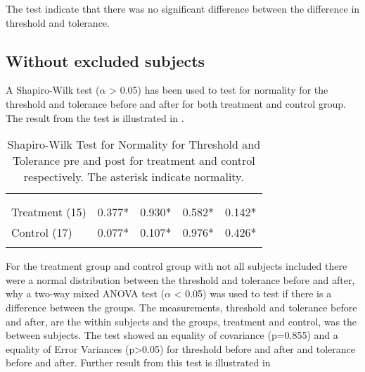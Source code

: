 The test indicate that there was no significant difference between the difference in threshold and tolerance.

\subsection{Without excluded subjects}
A Shapiro-Wilk test ($\alpha$ > 0.05) has been used to test for normality for the threshold and tolerance before and after for both treatment and control group. The result from the test is illustrated in .

\begin{longtable} {l|c|c|c|c}
\rowcolor[HTML]{C0C0C0} 
  \color[HTML]{000000}{} & 
 \multicolumn{2}{c|}{ \color[HTML]{000000}{\textbf{Threshold}}} & \multicolumn{2}{c}{ \color[HTML]{000000}{\textbf{Tolerance}}}  	\\  \rule{0pt}{3ex} 
  \cellcolor[HTML]{C0C0C0}{} &
 \multicolumn{1}{c|}{ \cellcolor[HTML]{C0C0C0}{Pre }} & \multicolumn{1}{c|}{ \cellcolor[HTML]{C0C0C0}{Post}} 
 & \multicolumn{1}{|c|}{ \cellcolor[HTML]{C0C0C0}{Pre}} 
 & \multicolumn{1}{c}{ \cellcolor[HTML]{C0C0C0}{Post}} 	\\ \hline 
Treatment (15) & 0.377*  & 0.930* & 0.582* & 0.142* \\ \hline
Control (17)& 0.077* & 0.107* & 0.976* & 0.426* \\ \hline
	\caption{Shapiro-Wilk Test for Normality for Threshold and Tolerance pre and post for treatment and control respectively. The asterisk indicate normality.}
	\label{tab:ShapiroWilk1}
\end{longtable}
\vspace{-.5cm}

For the treatment group and control group with not all subjects included there were a normal distribution between the threshold and tolerance before and after, why a two-way mixed ANOVA test ($\alpha$ < 0.05) was used to test  if there is a difference between the groups. The measurements, threshold and tolerance before and after, are the within subjects and the groups, treatment and control, was the between subjects. The test showed an equality of covariance (p=0.855) and a equality of Error Variances (p>0.05) for threshold before and after and tolerance before and after. Further result from this test is illustrated in 

